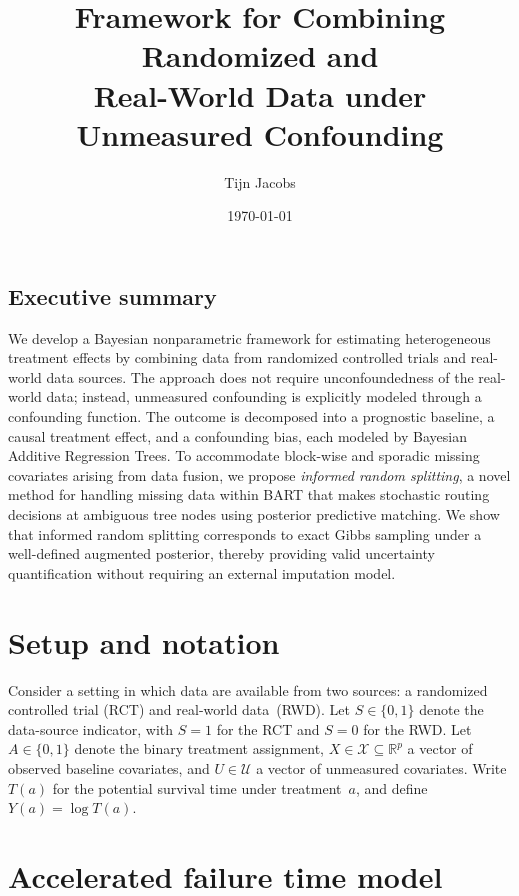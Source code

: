 \documentclass[10pt]{article}
\title{Framework for Combining Randomized and\\Real-World Data under Unmeasured Confounding}
\author{Tijn Jacobs}
\date{\today}
\theoremstyle{plain}
\theoremstyle{definition}
\theoremstyle{remark}
\newcommand{\R}{\mathbb{R}}
\begin{document}
\maketitle

\subsection*{Executive summary}
\noindent
We develop a Bayesian nonparametric framework for estimating heterogeneous treatment effects by combining data from randomized controlled trials and real-world data sources. The approach does not require unconfoundedness of the real-world data; instead, unmeasured confounding is explicitly modeled through a confounding function. The outcome is decomposed into a prognostic baseline, a causal treatment effect, and a confounding bias, each modeled by Bayesian Additive Regression Trees. To accommodate block-wise and sporadic missing covariates arising from data fusion, we propose \emph{informed random splitting}, a novel method for handling missing data within BART that makes stochastic routing decisions at ambiguous tree nodes using posterior predictive matching. We show that informed random splitting corresponds to exact Gibbs sampling under a well-defined augmented posterior, thereby providing valid uncertainty quantification without requiring an external imputation model.

\section{Setup and notation}

Consider a setting in which data are available from two sources: a randomized controlled trial (RCT) and real-world data~(RWD). Let $S \in \{0,1\}$ denote the data-source indicator, with $S=1$ for the RCT and $S=0$ for the RWD. Let $A \in \{0,1\}$ denote the binary treatment assignment, $X \in \mathcal{X} \subseteq \R^p$ a vector of observed baseline covariates, and $U \in \mathcal{U}$ a vector of unmeasured covariates. Write $T(a)$ for the potential survival time under treatment~$a$, and define $Y(a) = \log T(a)$.

\section{Accelerated failure time model}
\end{document}

